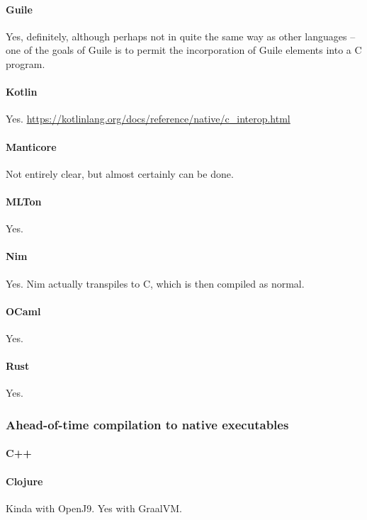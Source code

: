 \paragraph{Guile}
Yes, definitely, although perhaps not in quite the same way as other languages -- one of the goals of Guile is to permit the incorporation of Guile elements into a C program.

\paragraph{Kotlin}
Yes. \url{https://kotlinlang.org/docs/reference/native/c_interop.html}

\paragraph{Manticore}
Not entirely clear, but almost certainly can be done.

\paragraph{MLTon}
Yes.

\paragraph{Nim}
Yes.  Nim actually transpiles to C, which is then compiled as normal.

\paragraph{OCaml}
Yes.


\paragraph{Rust}
Yes.


\subsubsection{Ahead-of-time compilation to native executables}

\paragraph{C++}

\paragraph{Clojure}
Kinda with OpenJ9.  Yes with GraalVM.

